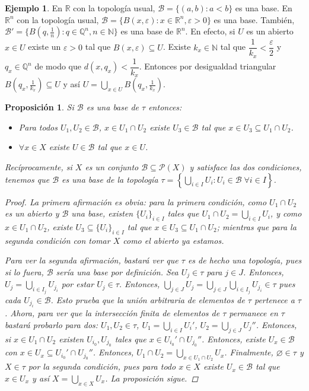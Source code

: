 \documentclass[12pt]{book}
\newtheorem{prop}[teo]{Proposición}
\theoremstyle{definition}
\newtheorem{ex}[teo]{Ejemplo}
\newcommand{\RR}{\mathbb{R}}      %
\newcommand{\NN}{\mathbb{N}}
\newcommand{\QQ}{\mathbb{Q}}
\newcommand{\PP}{\mathscr{P}}
\let\emptyset\varnothing
\begin{document}
\begin{ex}
En $\RR$ con la topología usual, $\mathscr{B}=\{(a,b) : a<b\}$ es una base. En $\RR^n$ con la topología usual, $\mathscr{B}=\{B(x,\varepsilon) : x\in\RR^n, \varepsilon > 0\}$ es una base. También, $\mathscr{B}' = \{B(q,\frac{1}{n}) : q\in\QQ^n , n\in\NN\}$ es una base de $\RR^n$. En efecto, si $U$ es un abierto $x\in U$ existe un $\varepsilon >0$ tal que $B(x,\varepsilon)\subseteq U$. Existe $k_x\in\NN$ tal que $\dfrac{1}{k_x}<\dfrac{\varepsilon}{2}$ y $q_x\in\QQ^n$ de modo que $d(x,q_x)<\dfrac{1}{k_x}$. Entonces por desigualdad triangular $B(q_x,\frac{1}{k_x})\subseteq U$ y así $U=\displaystyle\bigcup_{x\in U} B\left(q_x,\frac{1}{k_x}\right)$.
\end{ex}

\begin{prop}
Si $\mathscr{B}$ es una base de $\tau$ entonces: \begin{itemize} \item Para todos $U_1,U_2\in\mathscr{B}$, $x\in U_1\cap U_2$ existe $U_3\in\mathscr{B}$ tal que $x\in U_3\subseteq U_1\cap U_2$. \item $\forall x\in X$ existe $U\in \mathscr{B}$ tal que $x\in U$.\end{itemize}

Recíprocamente, si $X$ es un conjunto $\mathscr{B}\subseteq \PP(X)$ y satisface las dos condiciones, tenemos que $\mathscr{B}$ es una base de la topología $\tau = \left\{\displaystyle\bigcup_{i\in I}U_i : U_i\in \mathscr{B} \;\forall i\in I \right\}$.
\begin{proof}

La primera afirmación es obvia: para la primera condición, como $U_1\cap U_2$ es un abierto y $\mathscr{B}$ una base, existen $\{U_i\}_{i\in I}$ tales que $U_1\cap U_2 = \displaystyle\bigcup_{i\in I}U_i$, y como $x\in U_1\cap U_2$, existe $U_3 \subseteq \{U_i\}_{i\in I}$ tal que $x\in U_3\subseteq U_1\cap U_2$; mientras que para la segunda condición con tomar $X$ como el abierto ya estamos.

Para ver la segunda afirmación, bastará ver que $\tau$ es de hecho una topología, pues si lo fuera, $\mathscr{B}$ sería una base por definición. Sea $U_j\in \tau$ para $j\in J$. Entonces, $U_j = \displaystyle\bigcup_{i\in I_j} U_{j_i}$ por estar $U_j\in\tau$. Entonces, $\displaystyle\bigcup_{j\in J} U_j = \displaystyle\bigcup_{j\in J}\bigcup_{i\in I_j} U_{j_i} \in \tau$ pues cada $U_{j_i}\in\mathscr{B}$. Esto prueba que la unión arbitraria de elementos de $\tau$ pertenece a $\tau$. Ahora, para ver que la intersección finita de elementos de $\tau$ permanece en $\tau$ bastará probarlo para dos: $U_1,U_2\in \tau$, $U_1 = \displaystyle\bigcup_{i\in I} U_i'$, $U_2 = \displaystyle\bigcup_{j\in J}U_j''$. Entonces, si $x\in U_1\cap U_2$ existen $U_{i_0}, U_{j_0}$ tales que $x\in U_{i_0}'\cap U_{j_0}''$. Entonces, existe $U_x\in \mathscr{B}$ con $x\in U_x\subseteq U_{i_0}'\cap U_{j_0}''$. Entonces, $U_1\cap U_2 = \displaystyle\bigcup_{x\in U_1\cap U_2} U_x$. Finalmente, $\emptyset\in \tau$ y $X\in \tau$ por la segunda condición, pues para todo $x\in X$ existe $U_x\in\mathscr{B}$ tal que $x\in U_x$ y así $X=\displaystyle\bigcup_{x\in X}U_x$. La proposición sigue.


\end{proof}
\end{prop}
\end{document}
